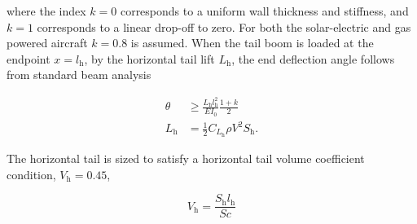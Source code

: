where the index $k=0$ corresponds to a uniform wall thickness and stiffness, and $k=1$ corresponds to a linear drop-off to zero.  For both the solar-electric and gas powered aircraft $k=0.8$ is assumed.  
When the tail boom is loaded at the endpoint $x=l_{\text{h}}$, by the horizontal tail lift $L_{\text{h}}$, the end deflection angle follows from standard beam analysis

\begin{align}
    \label{e:boomdefl}
    \theta &\geq \frac{L_{\text{h}} l_{\text{h}}^2}{EI_0} \frac{1+k}{2} \\
    L_{\text{h}} &= \frac{1}{2} C_{L_{\text{h}}} \rho V^2 S_{\text{h}}.
\end{align}

The horizontal tail is sized to satisfy a horizontal tail volume coefficient condition, $V_{\text{h}} = 0.45$,\cite{aircraftrules}

\begin{equation}
    V_{\text{h}} = \frac{S_{\text{h}}l_{\text{h}}}{Sc}
\end{equation}

% 
% 
% 
% 
% 
% 

